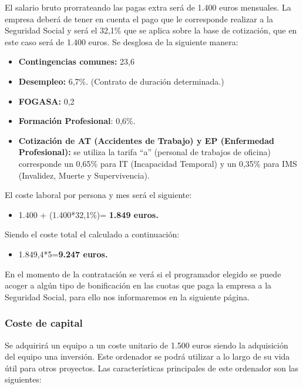 El salario bruto prorrateando las pagas extra será de 1.400 euros mensuales. La empresa deberá de tener en cuenta el pago que le corresponde realizar a la Seguridad Social \cite{bases:info} \cite{tarifas:info} y será el 32,1\% que se aplica sobre la base de cotización, que en este caso será de 1.400 euros. Se desglosa de la siguiente manera:

\begin{itemize}
	\item \textbf{Contingencias comunes:} 23,6%
	\item \textbf{Desempleo:} 6,7\%. (Contrato de duración determinada.)
	\item \textbf{FOGASA:} 0,2%
	\item \textbf{Formación Profesional}: 0,6\%.
	\item \textbf{Cotización de AT (Accidentes de Trabajo) y EP (Enfermedad Profesional):} se utiliza la tarifa “a” (personal de trabajos de oficina) corresponde un 0,65\% para IT (Incapacidad Temporal) y un 0,35\% para IMS (Invalidez, Muerte y Supervivencia).

\end{itemize}

El coste laboral por persona y mes será el siguiente:

\begin{itemize}
	\item 1.400 + (1.400*32,1\%)= \textbf{1.849 euros.}
\end{itemize}

Siendo el coste total el calculado a continuación:

\begin{itemize}
	\item 1.849,4*5=\textbf{9.247 euros.}
\end{itemize}

En el momento de la contratación se verá si el programador elegido se puede acoger a algún tipo de bonificación \cite{bonif:info} en las cuotas que paga la empresa a la Seguridad Social, para ello nos informaremos en la siguiente página.


\subsubsection{Coste de capital}
Se adquirirá un equipo a un coste unitario de 1.500 euros siendo la adquisición del equipo una inversión. Este ordenador se podrá utilizar a lo largo de su vida útil para otros proyectos. Las características principales de este ordenador son las siguientes:

